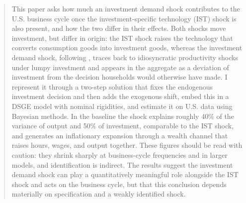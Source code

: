 \begin{abstract}
This paper asks how much an investment demand shock contributes to the U.S. business cycle once the investment-specific technology (IST) shock is also present, and how the two differ in their effects. Both shocks move investment, but differ in origin: the IST shock raises the technology that converts consumption goods into investment goods, whereas the investment demand shock, following \cite{nireiOriginsPropagationAnimal}, traces back to idiosyncratic productivity shocks under lumpy investment and appears in the aggregate as a deviation of investment from the decision households would otherwise have made. I represent it through a two-step solution that fixes the endogenous investment decision and then adds the exogenous shift, embed this in a DSGE model with nominal rigidities, and estimate it on U.S. data using Bayesian methods. In the baseline the shock explains roughly 40\% of the variance of output and 50\% of investment, comparable to the IST shock, and generates an inflationary expansion through a wealth channel that raises hours, wages, and output together. These figures should be read with caution: they shrink sharply at business-cycle frequencies and in larger models, and identification is indirect. The results suggest the investment demand shock can play a quantitatively meaningful role alongside the IST shock and acts on the business cycle, but that this conclusion depends materially on specification and a weakly identified shock.
\end{abstract}
